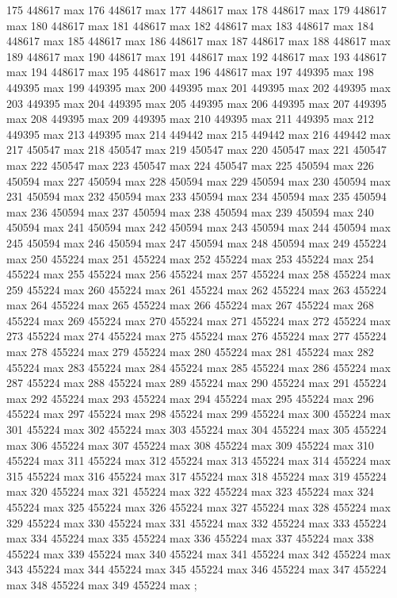 {175 448617 max
176 448617 max
177 448617 max
178 448617 max
179 448617 max
180 448617 max
181 448617 max
182 448617 max
183 448617 max
184 448617 max
185 448617 max
186 448617 max
187 448617 max
188 448617 max
189 448617 max
190 448617 max
191 448617 max
192 448617 max
193 448617 max
194 448617 max
195 448617 max
196 448617 max
197 449395 max
198 449395 max
199 449395 max
200 449395 max
201 449395 max
202 449395 max
203 449395 max
204 449395 max
205 449395 max
206 449395 max
207 449395 max
208 449395 max
209 449395 max
210 449395 max
211 449395 max
212 449395 max
213 449395 max
214 449442 max
215 449442 max
216 449442 max
217 450547 max
218 450547 max
219 450547 max
220 450547 max
221 450547 max
222 450547 max
223 450547 max
224 450547 max
225 450594 max
226 450594 max
227 450594 max
228 450594 max
229 450594 max
230 450594 max
231 450594 max
232 450594 max
233 450594 max
234 450594 max
235 450594 max
236 450594 max
237 450594 max
238 450594 max
239 450594 max
240 450594 max
241 450594 max
242 450594 max
243 450594 max
244 450594 max
245 450594 max
246 450594 max
247 450594 max
248 450594 max
249 455224 max
250 455224 max
251 455224 max
252 455224 max
253 455224 max
254 455224 max
255 455224 max
256 455224 max
257 455224 max
258 455224 max
259 455224 max
260 455224 max
261 455224 max
262 455224 max
263 455224 max
264 455224 max
265 455224 max
266 455224 max
267 455224 max
268 455224 max
269 455224 max
270 455224 max
271 455224 max
272 455224 max
273 455224 max
274 455224 max
275 455224 max
276 455224 max
277 455224 max
278 455224 max
279 455224 max
280 455224 max
281 455224 max
282 455224 max
283 455224 max
284 455224 max
285 455224 max
286 455224 max
287 455224 max
288 455224 max
289 455224 max
290 455224 max
291 455224 max
292 455224 max
293 455224 max
294 455224 max
295 455224 max
296 455224 max
297 455224 max
298 455224 max
299 455224 max
300 455224 max
301 455224 max
302 455224 max
303 455224 max
304 455224 max
305 455224 max
306 455224 max
307 455224 max
308 455224 max
309 455224 max
310 455224 max
311 455224 max
312 455224 max
313 455224 max
314 455224 max
315 455224 max
316 455224 max
317 455224 max
318 455224 max
319 455224 max
320 455224 max
321 455224 max
322 455224 max
323 455224 max
324 455224 max
325 455224 max
326 455224 max
327 455224 max
328 455224 max
329 455224 max
330 455224 max
331 455224 max
332 455224 max
333 455224 max
334 455224 max
335 455224 max
336 455224 max
337 455224 max
338 455224 max
339 455224 max
340 455224 max
341 455224 max
342 455224 max
343 455224 max
344 455224 max
345 455224 max
346 455224 max
347 455224 max
348 455224 max
349 455224 max
};
